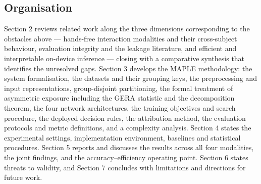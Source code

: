 \FloatBarrier

\subsection{Organisation}

Section 2 reviews related work along the three dimensions corresponding to the obstacles above --- hands-free interaction modalities and their cross-subject behaviour, evaluation integrity and the leakage literature, and efficient and interpretable on-device inference --- closing with a comparative synthesis that identifies the unresolved gaps. Section 3 develops the MAPLE methodology: the system formalisation, the datasets and their grouping keys, the preprocessing and input representations, group-disjoint partitioning, the formal treatment of asymmetric exposure including the GERA statistic and the decomposition theorem, the four network architectures, the training objectives and search procedure, the deployed decision rules, the attribution method, the evaluation protocols and metric definitions, and a complexity analysis. Section 4 states the experimental settings, implementation environment, baselines and statistical procedures. Section 5 reports and discusses the results across all four modalities, the joint findings, and the accuracy--efficiency operating point. Section 6 states threats to validity, and Section 7 concludes with limitations and directions for future work.
